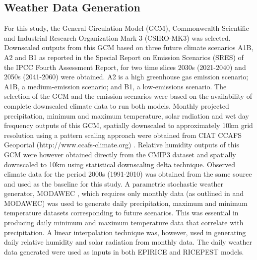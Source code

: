 \documentclass[preprint,12pt]{elsarticle}
\begin{document}
\subsection{Weather Data Generation}
For this study, the General Circulation Model (GCM), Commonwealth Scientific and Industrial Research Organization Mark 3 (CSIRO-MK3) was selected. Downscaled outputs from this GCM based on three future climate scenarios A1B, A2 and B1 as reported in the Special Report on Emission Scenarios (SRES) of the IPCC Fourth Assessment Report, for two time slices 2030s (2021-2040) and 2050s (2041-2060) were obtained. A2 is a high greenhouse gas emission scenario; A1B, a medium-emission scenario; and B1, a low-emissions scenario. The selection of the GCM and the emission scenarios were based on the availability of complete downscaled climate data to run both models. Monthly projected precipitation, minimum and maximum temperature, solar radiation and wet day frequency outputs of this GCM, spatially downscaled to approximately 10km grid resolution using a pattern scaling approach were obtained from CIAT CCAFS Geoportal (http://www.ccafs-climate.org) \cite{Jones2009}. Relative humidity outputs of this GCM were however obtained directly from the CMIP3 dataset and spatially downscaled to 10km using statistical downscaling delta technique. Observed climate data for the period 2000s (1991-2010) was obtained from the same source and used as the baseline for this study. A parametric stochastic weather generator, MODAWEC \cite{Liu2009}, which requires only monthly data (as outlined in \citet{Geng1986} and MODAWEC) was used to generate daily precipitation, maximum and minimum temperature datasets corresponding to future scenarios. This was essential in producing daily minimum and maximum temperature data that correlate with precipitation. A linear interpolation technique was, however, used in generating daily relative humidity and solar radiation from monthly data. The daily weather data generated were used as inputs in both EPIRICE and RICEPEST models.
\end{document}
